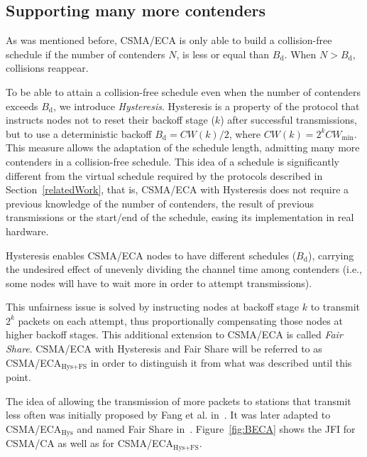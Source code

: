 	\subsection{Supporting many more contenders}\label{moreContenders}
	As was mentioned before, CSMA/ECA is only able to build a collision-free schedule if the number of contenders $N$, is less or equal than $B_{\text{d}}$. When $N > B_{\text{d}}$, collisions reappear. 
	
	To be able to attain a collision-free schedule even when the number of contenders exceeds $B_{\text{d}}$, we introduce \emph{Hysteresis}. Hysteresis is a property of the protocol that instructs nodes not to reset their backoff stage ($k$) after successful transmissions, but to use a deterministic backoff $B_{\text{d}}=CW(k)/2$, where $CW(k)=2^{k}CW_{\min}$. This measure allows the adaptation of the schedule length, admitting many more contenders in a collision-free schedule. This idea of a schedule is significantly different from the virtual schedule required by the protocols described in Section~\ref{relatedWork}, that is, CSMA/ECA with Hysteresis does not require a previous knowledge of the number of contenders, the result of previous transmissions or the start/end of the schedule, easing its implementation in real hardware.
	
	Hysteresis enables CSMA/ECA nodes to have different schedules ($B_{\text{d}}$), carrying the undesired effect of unevenly dividing the channel time among contenders (i.e., some nodes will have to wait more in order to attempt transmissions).
	
	This unfairness issue is solved by instructing nodes at backoff stage $k$ to transmit $2^{k}$ packets on each attempt, thus proportionally compensating those nodes at higher backoff stages. This additional extension to CSMA/ECA is called \emph{Fair Share}. CSMA/ECA with Hysteresis and Fair Share will be referred to as CSMA/ECA$_{\text{Hys+FS}}$ in order to distinguish it from what was described until this point.
	
	The idea of allowing the transmission of more packets to stations that transmit less often was initially proposed by Fang et al. in~\cite{L_MAC}. It was later adapted to CSMA/ECA$_{\text{Hys}}$ and named Fair Share in~\cite{research2standards}. Figure~\ref{fig:BECA} shows the JFI for CSMA/CA as well as for CSMA/ECA$_{\text{Hys+FS}}$.
	
	

